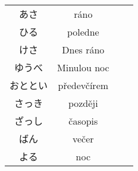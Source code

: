 \begin{table}[H]
\begin{tabular}{cccc}
あさ       & ráno               &    &     \\
ひる       & poledne            &    &     \\
けさ       & Dnes ráno          &    &     \\
ゆうべ      & Minulou noc        &    &     \\
おととい     & předevčírem        &    &     \\
さっき      & později            &    &     \\
ざっし      & časopis            &    &     \\
ばん       & večer              &    &     \\
よる       & noc                &    &    \\
\hline
\end{tabular}
\end{table}